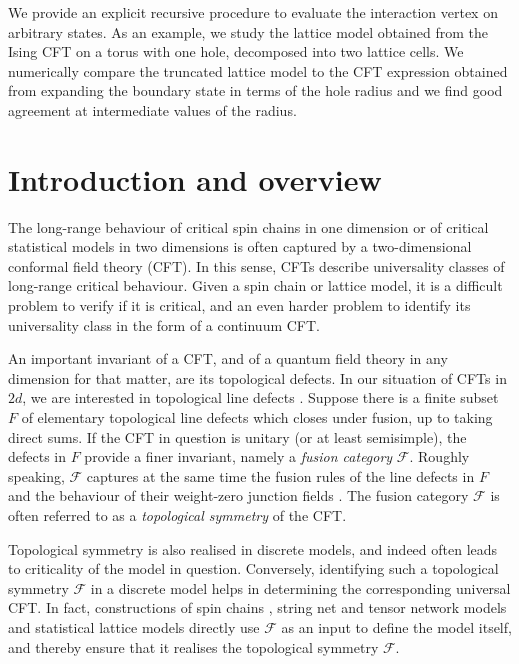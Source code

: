 \documentclass[11pt,a4paper]{article}
\numberwithin{equation}{section}
\begin{document}
We provide an explicit recursive procedure to evaluate the interaction vertex on arbitrary states.  
As an example, we study the lattice model obtained from the Ising CFT on a torus with one hole, decomposed into two lattice cells. We numerically compare the truncated lattice model to the CFT expression obtained from expanding the boundary state in terms of the hole radius and we find good agreement at intermediate values of the radius.


\newpage
\setcounter{tocdepth}{2}
\tableofcontents


\newpage

\section{Introduction and overview}

The long-range behaviour of critical spin chains in one dimension or of critical statistical models in two dimensions is often captured by a two-dimensional conformal field theory (CFT). In this sense, CFTs describe universality classes of long-range critical behaviour.
Given a spin chain or lattice model, it is a difficult problem to verify if it is critical, and an even harder problem to identify its universality class in the form of a continuum CFT.

An important invariant of a CFT, and of a quantum field theory in any dimension for that matter, are its topological defects. In our situation of CFTs in $2d$, we are interested in topological line defects \cite{Petkova:2000ip,Frohlich:2006ch}. Suppose there is a finite subset $F$ of elementary topological line defects which closes under fusion, up to taking direct sums. If the CFT in question is unitary (or at least semisimple), the defects in $F$ provide a finer invariant, namely a \textit{fusion category} $\mathcal{F}$. Roughly speaking, $\mathcal{F}$ captures at the same time the fusion rules of the line defects in $F$ and the behaviour of their weight-zero junction fields \cite{Frohlich:2006ch}. The fusion category $\mathcal{F}$ is often referred to as a \textit{topological symmetry} of the CFT.

Topological symmetry is also realised in discrete models, and indeed often leads to criticality of the model in question. Conversely, identifying such a topological symmetry $\mathcal{F}$ in a discrete model helps in determining the corresponding universal CFT. In fact, constructions of spin chains 
\cite{PhysRevLett.98.160409,Pfeifer2012,Buican:2017rxc,belletete2020topological}, string net and tensor network models \cite{Levin:2004mi,Kitaev:2011dxc,Vanhove:2018wlb,Lootens:2020mso} and statistical lattice models \cite{Aasen:2016dop,Aasen:2020jwb} directly use $\mathcal{F}$ as an input to define the model itself, and thereby ensure that it realises the topological symmetry $\mathcal{F}$.
\end{document}
